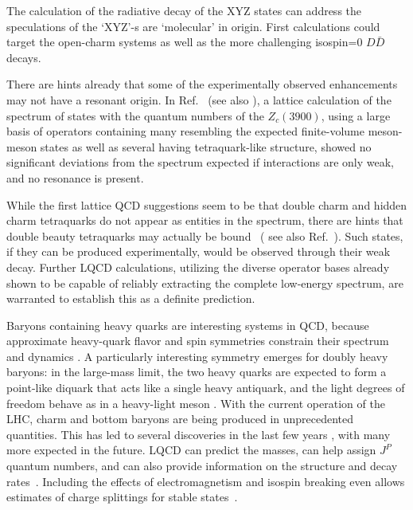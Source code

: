 
The calculation of the radiative decay of the XYZ states can address the speculations of the `XYZ'-s are `molecular' in origin. First calculations could target the open-charm systems as well as the more challenging isospin=0 $D\bar{D}$ decays.

There are hints already that some of the experimentally observed enhancements may not have a resonant origin. In Ref.~\cite{Cheung:2017tnt} (see also \cite{Prelovsek:2014swa}), a lattice calculation of the spectrum of states with the quantum numbers of the $Z_c(3900)$, using a large basis of operators containing many resembling the expected finite-volume meson-meson states as well as several having tetraquark-like structure, showed no significant deviations from the spectrum expected if interactions are only weak, and no resonance is present. 

While the first lattice QCD suggestions seem to be that double charm and hidden charm tetraquarks do not appear as entities in the spectrum, there are hints that double beauty tetraquarks may actually be {bound}~\cite{Francis:2016hui} ( see also Ref.~\cite{Hughes:2017xie}). Such states, if they can be produced experimentally, would be observed through their weak decay. Further LQCD calculations, utilizing the diverse operator bases already shown to be capable of  reliably extracting the complete low-energy spectrum, are warranted to establish this as a definite prediction. 

 Baryons containing heavy quarks are interesting systems in QCD, because approximate heavy-quark flavor and spin symmetries
constrain their spectrum and dynamics \cite{Korner:1994nh, Manohar:2000dt}. A particularly interesting symmetry emerges for doubly heavy baryons: in the large-mass limit, the two heavy quarks
are expected to form a point-like diquark that acts like a single heavy antiquark, and the light degrees of freedom behave as in a
heavy-light meson \cite{Savage:1990di, Brambilla:2005yk}. With the current operation of the LHC, charm and bottom baryons are being produced in unprecedented quantities.
This has led to several discoveries in the last few years \cite{Chatrchyan:2012ni, Aaij:2012da, Aaij:2014yka, Aaij:2016jnn, Aaij:2017ueg,  Aaij:2017vbw, Aaij:2017nav}, with many more expected in the future. LQCD
can predict the masses, can help assign $J^P$ quantum numbers, and can also provide information on the structure and decay rates~\cite{Brown:2014ena, Padmanath:2015jea, Bali:2015lka, Alexandrou:2017xwd}. Including the effects of electromagnetism and isospin breaking even allows estimates of charge splittings for stable states~\cite{Borsanyi:2014jba}.



